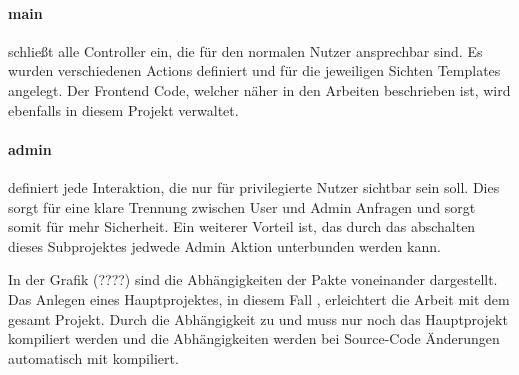 \paragraph{main} schließt alle Controller ein, die für den normalen Nutzer ansprechbar sind. Es wurden verschiedenen Actions definiert und für die jeweiligen Sichten Templates angelegt. Der Frontend Code, welcher näher in den Arbeiten \cite{bp-norman, bp-tomh, bp-anita} beschrieben ist, wird ebenfalls in diesem Projekt verwaltet.

\paragraph{admin} definiert jede Interaktion, die nur 
für privilegierte Nutzer sichtbar sein soll. Dies sorgt für eine klare Trennung zwischen User und Admin Anfragen und sorgt somit für mehr Sicherheit. Ein weiterer Vorteil ist, das durch das abschalten dieses Subprojektes jedwede Admin Aktion unterbunden werden kann.

In der Grafik (????) sind die Abhängigkeiten der Pakte voneinander dargestellt. Das Anlegen eines Hauptprojektes, in diesem Fall , erleichtert die Arbeit mit dem gesamt Projekt. Durch die Abhängigkeit zu  und  muss nur noch das Hauptprojekt kompiliert werden und die Abhängigkeiten werden bei Source-Code Änderungen automatisch mit kompiliert.
